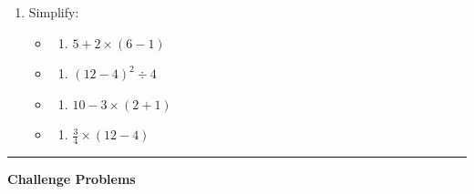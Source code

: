 \documentclass[
  letterpaper,
  DIV=11,
  numbers=noendperiod]{scrreprt}
\providecommand{\tightlist}{%
  \setlength{\itemsep}{0pt}\setlength{\parskip}{0pt}}
\begin{document}
\begin{enumerate}
\def\labelenumi{\arabic{enumi}.}
\setcounter{enumi}{2}
\item
  Simplify:

  \begin{itemize}
  \tightlist
  \item
    \begin{enumerate}
    \def\labelenumii{\alph{enumii}.}
    \tightlist
    \item
      \(5 + 2 \times (6 - 1)\)\\
    \end{enumerate}
  \item
    \begin{enumerate}
    \def\labelenumii{\alph{enumii}.}
    \setcounter{enumii}{1}
    \tightlist
    \item
      \((12 - 4)^2 \div 4\)\\
    \end{enumerate}
  \item
    \begin{enumerate}
    \def\labelenumii{\alph{enumii}.}
    \setcounter{enumii}{2}
    \tightlist
    \item
      \(10 - 3 \times (2 + 1)\)\\
    \end{enumerate}
  \item
    \begin{enumerate}
    \def\labelenumii{\alph{enumii}.}
    \setcounter{enumii}{3}
    \tightlist
    \item
      \(\frac{3}{4} \times (12 - 4)\)
    \end{enumerate}
  \end{itemize}
\end{enumerate}

\begin{center}\rule{0.5\linewidth}{0.5pt}\end{center}

\textbf{Challenge Problems}
\end{document}
